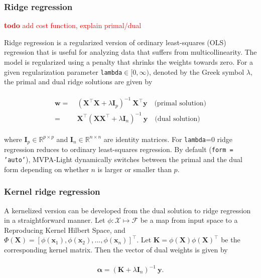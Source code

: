 \documentclass[utf8]{frontiersSCNS} %
\newcommand{\al}{\boldsymbol{\alpha}}
\newcommand{\w}{\mathbf{w}}
\newcommand{\x}{\mathbf{x}}
\newcommand{\y}{\mathbf{y}}
\newcommand{\I}{\mathbf{I}}
\newcommand{\K}{\mathbf{K}}
\newcommand{\R}{\mathbb{R}}
\newcommand{\X}{\mathbf{X}}
\newcommand{\ttt}[1]{\texttt{#1}}
\newcommand{\todo}[1]{\textcolor{red}{\textbf{todo} #1}}
\begin{document}
\subsubsection{Ridge regression}

\todo{add cost function, explain primal/dual}

Ridge regression is a regularized version of ordinary least-squares (OLS) regression that is useful for analyzing data that suffers from multicollinearity. The model is regularized using a penalty that shrinks the weights towards zero. For a given regularization parameter \ttt{lambda}$\in[0,\infty)$, denoted by the Greek symbol $\lambda$, the primal and dual ridge solutions are given by


\begin{align}
\begin{split}
\label{eq:ridge}
\w =\ & (\X^\top\X + \lambda\I_p)^{-1}\ \X^\top\y \quad\text{(primal solution)}\\
 =\ & \X^\top (\X\X^\top + \lambda\I_n)^{-1}\ \y \quad\text{(dual solution)}
\end{split}
\end{align}

where $\I_p\in\R^{p\times p}$ and $\I_n\in\R^{n\times n}$ are identity matrices. For \ttt{lambda}=0 ridge regression reduces to ordinary least-squares regression. By default (\ttt{form = 'auto'}), MVPA-Light dynamically switches between the primal and the dual form depending on whether $n$ is larger or smaller than $p$.

\subsubsection{Kernel ridge regression}

A kernelized version can be developed from the dual solution to ridge regression in a straightforward manner. Let $\phi:\mathcal{X}\mapsto\mathcal{F}$ be a map from input space to a Reproducing Kernel Hilbert Space, and $\Phi(\X) = [\phi(\x_1),\phi(\x_2),...,\phi(\x_n)]^\top$. Let $\K = \phi(\X)\phi(\X)^\top$ be the corresponding kernel matrix. Then the vector of dual weights is given by

\begin{align}
\begin{split}
\label{eq:kernel_ridge}
\al = (\K + \lambda\I_n)^{-1}\ \y.
\end{split}
\end{align}
\end{document}
